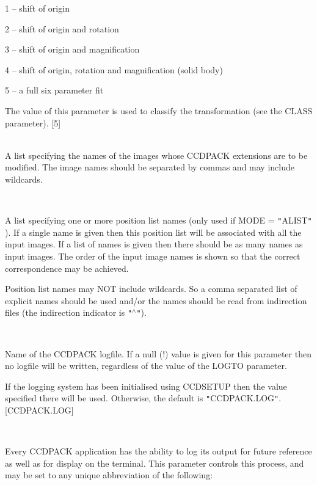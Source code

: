 \documentclass[twoside,11pt]{article}
\newcommand{\htmlref}[2]{#1}
\renewcommand{\_}{\texttt{\symbol{95}}}
\newcommand{\qt}[1]{{\tt "}#1{\tt "}}
\newcommand{\xroutine}[1]{\htmlref{{\sc #1}}{#1}}
\newcommand{\sstsubsection}[1]{ \item[{#1}] \mbox{} \\}
\newcommand{\sstitemlist}[1]{
  \mbox{} \\
  \vspace{-3.5ex}
  \begin{itemize}
     #1
  \end{itemize}
}
\newcommand{\sstitem}{\item}
\newcommand{\sstsubsection}[1]{\item[{#1}]}
\newcommand{\sstitemlist}[1]{
      \begin{itemize}
         #1
      \end{itemize}
      \\
   }
\newcommand{\sstitem}{\item}
\begin{document}
{{{{            \sstitem
               1 -- shift of origin

            \sstitem
               2 -- shift of origin and rotation

            \sstitem
               3 -- shift of origin and magnification

            \sstitem
               4 -- shift of origin, rotation and magnification
                      (solid body)

            \sstitem
               5 -- a full six parameter fit

         }
         The value of this parameter is used to classify the
         transformation (see the CLASS parameter).
         [5]
      }
      \sstsubsection{
         IN = IMAGE (Read)
      }{
         A list specifying the names of the images whose CCDPACK
         extensions are to be modified. The image names should be
         separated by commas and may include wildcards.
      }
      \sstsubsection{
         INLIST = LITERAL (Read)
      }{
         A list specifying one or more position list names (only used
         if MODE = \qt{ALIST} ). If a single name is given then this
         position list will be associated with all the input images. If
         a list of names is given then there should be as many names
         as input images. The order of the input image names is shown so
         that the correct correspondence may be achieved.

         Position list names may NOT include wildcards. So a comma
         separated list of explicit names should be used and/or the
         names should be read from indirection files (the indirection
         indicator is \qt{$^\wedge$}).
      }
      \sstsubsection{
         LOGFILE = FILENAME (Read)
      }{
         Name of the CCDPACK logfile.  If a null (!) value is given for
         this parameter then no logfile will be written, regardless of
         the value of the LOGTO parameter.

         If the logging system has been initialised using \xroutine{CCDSETUP}
         then the value specified there will be used. Otherwise, the
         default is \qt{CCDPACK.LOG}.
         [CCDPACK.LOG]
      }
      \sstsubsection{
         LOGTO = LITERAL (Read)
      }{
         Every CCDPACK application has the ability to log its output
         for future reference as well as for display on the terminal.
         This parameter controls this process, and may be set to any
         unique abbreviation of the following:
         \sstitemlist{

}}}}
\end{document}
